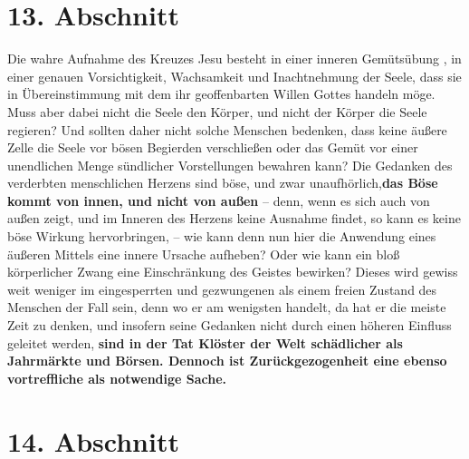 \section{13. Abschnitt} \label{kap5_ab13}

Die wahre Aufnahme des Kreuzes Jesu besteht in einer inneren Gemütsübung , in
einer genauen Vorsichtigkeit, Wachsamkeit und Inachtnehmung der Seele, dass sie
in Übereinstimmung mit dem ihr geoffenbarten Willen Gottes
 handeln möge. Muss
aber dabei nicht die Seele den Körper, und nicht der Körper die Seele regieren?
Und sollten daher nicht solche Menschen bedenken, dass keine äußere Zelle die
Seele vor bösen Begierden verschließen oder das Gemüt vor einer unendlichen
Menge sündlicher Vorstellungen bewahren kann? Die Gedanken des verderbten
menschlichen Herzens sind böse, und zwar unaufhörlich,\textbf{das Böse kommt von innen,
und nicht von außen} -- denn, wenn es sich auch von außen zeigt, und im Inneren
des Herzens keine Ausnahme findet, so kann es keine böse Wirkung hervorbringen,
-- wie kann denn nun hier die Anwendung eines äußeren Mittels eine innere Ursache
aufheben? Oder wie kann ein bloß körperlicher Zwang eine Einschränkung des
Geistes bewirken? Dieses wird gewiss weit weniger im eingesperrten und
gezwungenen als einem freien Zustand des Menschen der Fall sein, denn wo er am
wenigsten handelt, da hat er die meiste Zeit zu denken, und insofern seine
Gedanken nicht durch einen höheren Einfluss geleitet werden,
\label{ref:05_13_zurueckgezogenheit} \textbf{sind in der Tat
Klöster der Welt schädlicher als Jahrmärkte und Börsen. Dennoch ist
Zurückgezogenheit eine ebenso vortreffliche als notwendige Sache.} 

\section{14. Abschnitt} \label{kap5_ab14}

